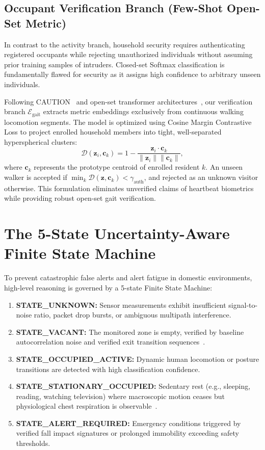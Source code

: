 \subsection{Occupant Verification Branch (Few-Shot Open-Set Metric)}
In contrast to the activity branch, household security requires authenticating registered occupants while rejecting unauthorized individuals without assuming prior training samples of intruders. Closed-set Softmax classification is fundamentally flawed for security as it assigns high confidence to arbitrary unseen individuals.

Following CAUTION~\cite{author2022caution} and open-set transformer architectures~\cite{argus2024argus}, our verification branch $\mathcal{E}_{\text{gait}}$ extracts metric embeddings exclusively from continuous walking locomotion segments. The model is optimized using Cosine Margin Contrastive Loss to project enrolled household members into tight, well-separated hyperspherical clusters:
\begin{equation}
    \mathcal{D}(\mathbf{z}_i, \mathbf{c}_k) = 1 - \frac{\mathbf{z}_i \cdot \mathbf{c}_k}{\|\mathbf{z}_i\| \|\mathbf{c}_k\|},
\end{equation}
where $\mathbf{c}_k$ represents the prototype centroid of enrolled resident $k$. An unseen walker is accepted if $\min_k \mathcal{D}(\mathbf{z}, \mathbf{c}_k) < \gamma_{\text{auth}}$, and rejected as an unknown visitor otherwise. This formulation eliminates unverified claims of heartbeat biometrics while providing robust open-set gait verification.

\section{The 5-State Uncertainty-Aware Finite State Machine}
To prevent catastrophic false alerts and alert fatigue in domestic environments, high-level reasoning is governed by a 5-state Finite State Machine:
\begin{enumerate}
    \item \textbf{STATE\_UNKNOWN:} Sensor measurements exhibit insufficient signal-to-noise ratio, packet drop bursts, or ambiguous multipath interference.
    \item \textbf{STATE\_VACANT:} The monitored zone is empty, verified by baseline autocorrelation noise and verified exit transition sequences~\cite{author2019widetect}.
    \item \textbf{STATE\_OCCUPIED\_ACTIVE:} Dynamic human locomotion or posture transitions are detected with high classification confidence.
    \item \textbf{STATE\_STATIONARY\_OCCUPIED:} Sedentary rest (e.g., sleeping, reading, watching television) where macroscopic motion ceases but physiological chest respiration is observable~\cite{author2026vitalcsi}.
    \item \textbf{STATE\_ALERT\_REQUIRED:} Emergency conditions triggered by verified fall impact signatures or prolonged immobility exceeding safety thresholds.
\end{enumerate}

